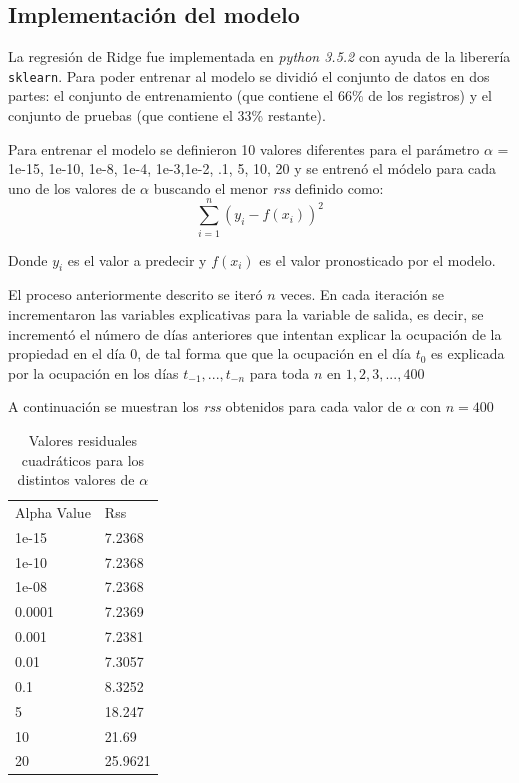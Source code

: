 \subsection*{Implementación del modelo}

La regresión de Ridge fue implementada en \emph{python 3.5.2} con ayuda de la liberería \texttt{sklearn}. Para poder entrenar al modelo se dividió el conjunto de datos en dos partes: el conjunto de entrenamiento (que contiene el 66\% de los registros) y el conjunto de pruebas (que contiene el 33\% restante). 

Para entrenar el modelo se definieron 10 valores diferentes para el parámetro $\alpha$ = 1e-15, 1e-10, 1e-8, 1e-4, 1e-3,1e-2, .1, 5, 10, 20 y se entrenó el módelo para cada uno de los valores de $\alpha$ buscando el menor \emph{rss} definido como: $$\sum_{i=1}^{n}(y_i - f(x_i))^2$$

Donde $y_i$ es el valor a predecir y $f(x_i)$ es el valor pronosticado por el modelo.

El proceso anteriormente descrito se iteró $n$ veces. En cada iteración se incrementaron las variables explicativas para la variable de salida, es decir, se incrementó el número de días anteriores que intentan explicar la ocupación de la propiedad en el día 0, de tal forma que que la ocupación en el día $t_0$ es explicada por la ocupación en los días $t_{-1},...,t_{-n}$ para toda $n$ en ${1,2,3,...,400}$

A continuación se muestran los \emph{rss} obtenidos para cada valor de $\alpha$ con $n = 400$

\begin{table}[]
\centering
\begin{tabular}{ll}
Alpha Value & Rss    \\
1e-15       & 7.2368 \\
1e-10       & 7.2368 \\
1e-08       & 7.2368 \\
0.0001      & 7.2369 \\
0.001       & 7.2381 \\
0.01        & 7.3057 \\
0.1         & 8.3252 \\
5           & 18.247 \\
10          & 21.69  \\
20          & 25.9621
\end{tabular}
\caption{Valores residuales cuadráticos para los distintos valores de $\alpha$}
\end{table}

